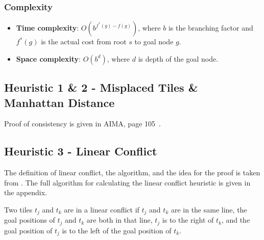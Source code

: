 \documentclass{llncs}
\begin{document}
\subsubsection{Complexity}
\begin{itemize}
	\item[] \textbf{Time complexity}: $O(b^{f^*(g)-f(g)})$, where $b$ is the branching factor and $f^*(g)$ is the actual cost from root $s$ to goal node $g$.
	\item[] \textbf{Space complexity}: $O(b^d)$, where $d$ is depth of the goal node.
\end{itemize}

\subsection{Heuristic 1 \& 2 - Misplaced Tiles \& Manhattan Distance}

Proof of consistency is given in AIMA, page 105~\cite{aima}.

\subsection{Heuristic 3 - Linear Conflict}

The definition of linear conflict, the algorithm, and the idea for the proof is taken from \cite{lc}.
The full algorithm for calculating the linear conflict heuristic is given in the appendix.

\begin{definition}
Two tiles $t_j$ and $t_k$ are in a linear conflict if $t_j$ and $t_k$ are in the same line, the goal positions of $t_j$ and $t_k$ are both in that line, $t_j$ is to the right of $t_k$, and the goal position of $t_j$ is to the left of the goal position of $t_k$.
\end{definition}
\end{document}
